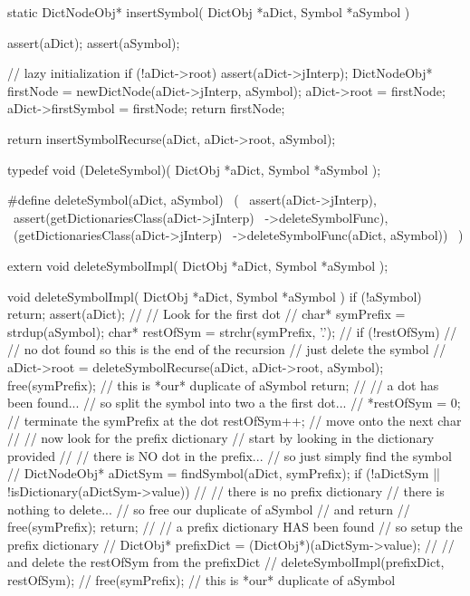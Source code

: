 \startTestSuite[insertSymbol]

\startCCode
static DictNodeObj* insertSymbol(
  DictObj *aDict,
  Symbol  *aSymbol
) {
  assert(aDict);
  assert(aSymbol);

  // lazy initialization
  if (!aDict->root) {
    assert(aDict->jInterp);
    DictNodeObj* firstNode = newDictNode(aDict->jInterp, aSymbol);
    aDict->root            = firstNode;
    aDict->firstSymbol     = firstNode;
    return firstNode;
  }

  return insertSymbolRecurse(aDict, aDict->root, aSymbol);
}
\stopCCode
\stopTestSuite

\startTestSuite[deleteSymbol]

\startCHeader
typedef void (DeleteSymbol)(
  DictObj *aDict,
  Symbol  *aSymbol
);

#define deleteSymbol(aDict, aSymbol)            \
  (                                             \
    assert(aDict->jInterp),                     \
    assert(getDictionariesClass(aDict->jInterp) \
      ->deleteSymbolFunc),                      \
    (getDictionariesClass(aDict->jInterp)       \
      ->deleteSymbolFunc(aDict, aSymbol))       \
  )
\stopCHeader

\setCHeaderStream{private}
\startCHeader
extern void deleteSymbolImpl(
  DictObj *aDict,
  Symbol  *aSymbol
);
\stopCHeader
\setCHeaderStream{public}

\startCCode
void deleteSymbolImpl(
  DictObj *aDict,
  Symbol  *aSymbol
) {
  if (!aSymbol) return;
  assert(aDict);
  //
  // Look for the first dot
  //
  char* symPrefix = strdup(aSymbol);
  char* restOfSym = strchr(symPrefix, '.');
  //
  if (!restOfSym) {
    //
    // no dot found so this is the end of the recursion
    // just delete the symbol
    //
    aDict->root = 
      deleteSymbolRecurse(aDict, aDict->root, aSymbol);
    free(symPrefix); // this is *our* duplicate of aSymbol
    return;
  }
  //
  // a dot has been found...
  // so split the symbol into two a the first dot...
  //
  *restOfSym = 0; // terminate the symPrefix at the dot
  restOfSym++;    // move onto the next char
  //
  // now look for the prefix dictionary
  // start by looking in the dictionary provided
  //
  // there is NO dot in the prefix...
  // so just simply find the symbol
  //
  DictNodeObj* aDictSym = findSymbol(aDict, symPrefix);
  if (!aDictSym || !isDictionary(aDictSym->value)) {
    //
    // there is no prefix dictionary
    // there is nothing to delete...
    // so free our duplicate of aSymbol
    // and return
    //
    free(symPrefix);
    return;
  }
  //
  // a prefix dictionary HAS been found
  // so setup the prefix dictionary
  //
  DictObj* prefixDict = (DictObj*)(aDictSym->value);
  //
  // and delete the restOfSym from the prefixDict
  //
  deleteSymbolImpl(prefixDict, restOfSym);
  //
  free(symPrefix); // this is *our* duplicate of aSymbol
}
\stopCCode

